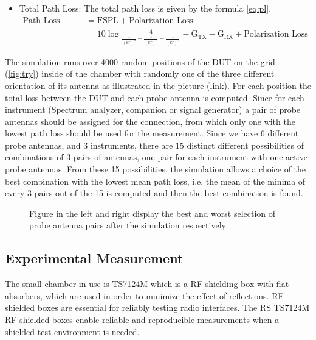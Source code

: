 \begin{itemize}
  \item Total Path Loss:
  The total path loss is given by the formula \ref{eq:pl},
  \begin{equation}  \label{eq:pl}
  \begin{split}
  \mbox{Path Loss (k,r)}  & = \mbox{FSPL} + \mbox{Polarization Loss} \\
  &= 10 \log\frac{4}{\frac{1}{(kr)^6}-\frac{1}{(kr)^4}+\frac{1}{(kr)^2}} - \mbox{G}_{\mbox{TX}} - \mbox{G}_{\mbox{RX}} + \mbox{Polarization Loss}
 \end{split}
 \end{equation}
   
   \end{itemize}
   
   
The simulation runs over 4000 random positions of the \acs{DUT} on the grid (\ref{fig:try}) inside of the chamber with randomly one of the three different orientation of its antenna as illustrated in the picture (link). For each position the total loss between the \acs{DUT} and each probe antenna is computed. Since for each instrument (Spectrum analyzer, companion or signal generator) a pair of probe antennas should be assigned for the connection, from which only one with the lowest path loss should be used for the measurement. Since we have 6 different probe antennas, and 3 instruments, there are 15 distinct different possibilities of combinations of 3 pairs of antennas, one pair for each instrument with one active probe antennas. From these 15 possibilities, the simulation allows a choice of the best combination with the lowest mean path loss, i.e. the mean of the minima of every 3 pairs out of the 15 is computed and then the best combination is found. 

\begin{figure}[H]
\vspace{-3cm}
  \hspace{-3cm}
   \vspace{-3.9cm}
\caption{Figure in the left and right display the best and worst selection of probe antenna pairs after the simulation respectively}
\label{fig:simu}
\end{figure}





\subsection{Experimental Measurement} 
The small chamber in use is TS7124M which is a \acs{RF} shielding box with flat absorbers, which are used in order to minimize the effect of reflections. \acs{RF} shielded boxes are essential for reliably testing radio interfaces. The \acs{RS}\textregistered{} TS7124M \acs{RF} shielded boxes enable reliable and reproducible measurements when a shielded test environment is needed. \\

